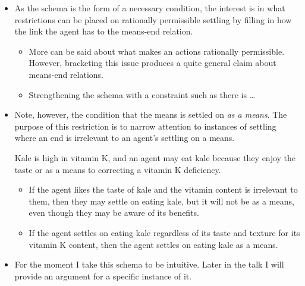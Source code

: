 \documentclass[10pt]{article}
\newcommand{\hand}{\ding{43}}
\begin{document}
\begin{itemize}
\item[\hand] As the schema is the form of a necessary condition, the interest is in what restrictions can be placed on rationally permissible settling by filling in how the link the agent has to the means-end relation.
  \begin{itemize}
  \item More can be said about what makes an actions rationally permissible.
    However, bracketing this issue produces a quite general claim about means-end relations.
  \item {\color{red} Strengthening the schema with a constraint such as there is \dots}
  \end{itemize}
\item Note, however, the condition that the means is settled on \emph{as a means}.
  The purpose of this restriction is to narrow attention to instances of settling where an end is irrelevant to an agent's settling on a means.
  \begin{example}
    Kale is high in vitamin K, and an agent may eat kale because they enjoy the taste or as a means to correcting a vitamin K deficiency.
    \begin{itemize}
    \item If the agent likes the taste of kale and the vitamin content is irrelevant to them, then they may settle on eating kale, but it will not be as a means, even though they may be aware of its benefits.
    \item If the agent settles on eating kale regardless of its taste and texture for its vitamin K content, then the agent settles on eating kale as a means.
    \end{itemize}
  \end{example}
\end{itemize}


\begin{itemize}
\item For the moment I take this schema to be intuitive.
  Later in the talk I will provide an argument for a specific instance of it.
\end{itemize}
\end{document}

